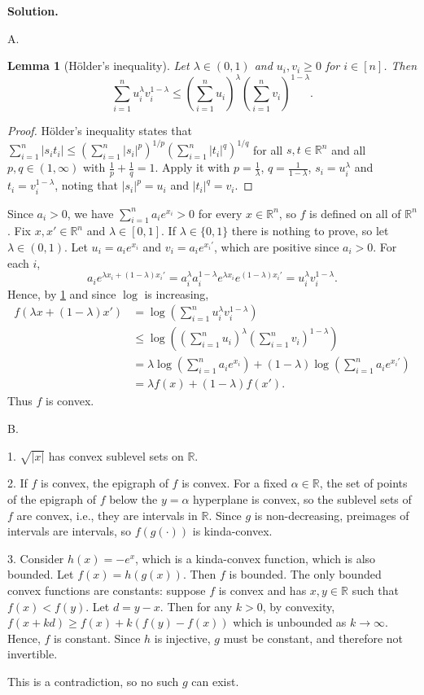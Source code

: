 \documentclass[11pt,letterpaper]{article}
\newtheorem{lemma}[theorem]{Lemma}
\theoremstyle{definition}
\newcommand{\reals}{\mathbb{R}}
\newcommand{\solution}{\medskip\noindent\textbf{Solution.}\par\medskip}
\begin{document}
\solution

A.

\begin{lemma}[H\"older's inequality]\label{lemma:holder}
    Let $\lambda\in(0,1)$ and $u_i,v_i\geq 0$ for $i\in[n]$. Then
    \[
        \sum_{i=1}^n u_i^{\lambda}v_i^{1-\lambda} \leq \left(\sum_{i=1}^n u_i\right)^{\lambda}\left(\sum_{i=1}^n v_i\right)^{1-\lambda}.
    \]
\end{lemma}
\begin{proof}
    H\"older's inequality states that $\sum_{i=1}^n |s_it_i| \leq \left(\sum_{i=1}^n |s_i|^p\right)^{1/p}\left(\sum_{i=1}^n |t_i|^q\right)^{1/q}$ for all $s,t\in\reals^n$ and all $p,q\in(1,\infty)$ with $\frac{1}{p}+\frac{1}{q}=1$.
    Apply it with $p=\frac{1}{\lambda}$, $q=\frac{1}{1-\lambda}$, $s_i=u_i^{\lambda}$ and $t_i=v_i^{1-\lambda}$, noting that $|s_i|^p=u_i$ and $|t_i|^q=v_i$.
\end{proof}

Since $a_i>0$, we have $\sum_{i=1}^n a_ie^{x_i}>0$ for every $x\in\reals^n$, so $f$ is defined on all of $\reals^n$.
Fix $x,x'\in\reals^n$ and $\lambda\in[0,1]$. If $\lambda\in\{0,1\}$ there is nothing to prove, so let $\lambda\in(0,1)$.
Let $u_i = a_ie^{x_i}$ and $v_i = a_ie^{x_i'}$, which are positive since $a_i>0$. For each $i$,
\[
    a_ie^{\lambda x_i + (1-\lambda)x_i'} = a_i^{\lambda}a_i^{1-\lambda}e^{\lambda x_i}e^{(1-\lambda)x_i'} = u_i^{\lambda}v_i^{1-\lambda}.
\]
Hence, by \cref{lemma:holder} and since $\log$ is increasing,
\begin{align*}
    f(\lambda x + (1-\lambda)x') &= \log\left(\sum_{i=1}^n u_i^{\lambda}v_i^{1-\lambda}\right)\\
    &\leq \log\left(\left(\sum_{i=1}^n u_i\right)^{\lambda}\left(\sum_{i=1}^n v_i\right)^{1-\lambda}\right)\\
    &= \lambda\log\left(\sum_{i=1}^n a_ie^{x_i}\right) + (1-\lambda)\log\left(\sum_{i=1}^n a_ie^{x_i'}\right)\\
    &= \lambda f(x) + (1-\lambda)f(x').
\end{align*}
Thus $f$ is convex.

B.

1. $\sqrt{|x|}$ has convex sublevel sets on $\reals$.

2. If $f$ is convex, the epigraph of $f$ is convex. 
For a fixed $\alpha\in \reals$, the set of points of the epigraph of $f$ below the $y=\alpha$ hyperplane is convex, so the sublevel sets of $f$ are convex, i.e., they are intervals in $\reals$.
Since $g$ is non-decreasing, preimages of intervals are intervals, so $f(g(\cdot))$ is kinda-convex.

3. Consider $h(x) = -e^x$, which is a kinda-convex function, which is also bounded.
Let $f(x) = h(g(x))$. Then $f$ is bounded.
The only bounded convex functions are constants: suppose $f$ is convex and has $x,y\in \reals$ such that $f(x)<f(y)$. 
Let $d=y-x$. Then for any $k>0$, by convexity, $f(x+kd)\geq f(x) + k(f(y)-f(x))$ which is unbounded as $k\to\infty$.
Hence, $f$ is constant. 
Since $h$ is injective, $g$ must be constant, and therefore not invertible.

This is a contradiction, so no such $g$ can exist.
\end{document}
